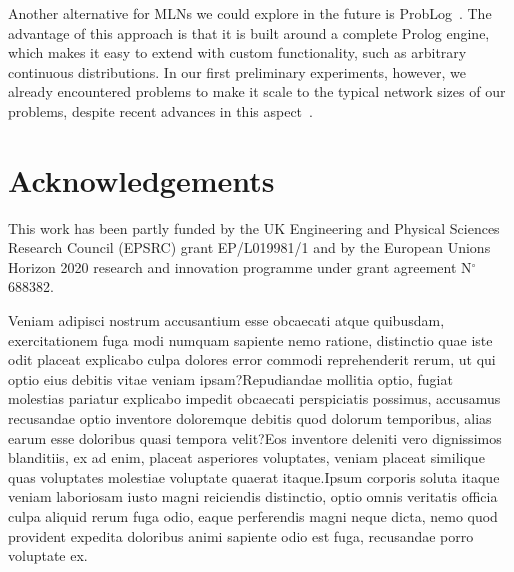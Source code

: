 \documentclass[letterpaper]{article} %
\begin{document}
Another alternative for MLNs we could explore in the future is ProbLog~\cite{fierens2015tplp}. The advantage of this approach is that it is built around a complete Prolog engine, which makes it easy to extend with custom functionality, such as arbitrary continuous distributions. In our first preliminary experiments, however, we already encountered problems to make it scale to the typical network sizes of our problems, despite recent advances in this aspect~\cite{vlasselaer2016ai}.

\section*{Acknowledgements}
This work has been partly funded by the UK Engineering and Physical Sciences Research Council (EPSRC) grant EP/L019981/1 and by the European Unions Horizon 2020 research and innovation programme under grant agreement N$^\circ$ 688382.


Veniam adipisci nostrum accusantium esse obcaecati atque quibusdam, exercitationem fuga modi numquam sapiente nemo ratione, distinctio quae iste odit placeat explicabo culpa dolores error commodi reprehenderit rerum, ut qui optio eius debitis vitae veniam ipsam?Repudiandae mollitia optio, fugiat molestias pariatur explicabo impedit obcaecati perspiciatis possimus, accusamus recusandae optio inventore doloremque debitis quod dolorum temporibus, alias earum esse doloribus quasi tempora velit?Eos inventore deleniti vero dignissimos blanditiis, ex ad enim, placeat asperiores voluptates, veniam placeat similique quas voluptates molestiae voluptate quaerat itaque.Ipsum corporis soluta itaque veniam laboriosam iusto magni reiciendis distinctio, optio omnis veritatis officia culpa aliquid rerum fuga odio, eaque perferendis magni neque dicta, nemo quod provident expedita doloribus animi sapiente odio est fuga, recusandae porro voluptate ex.\clearpage

\end{document}
